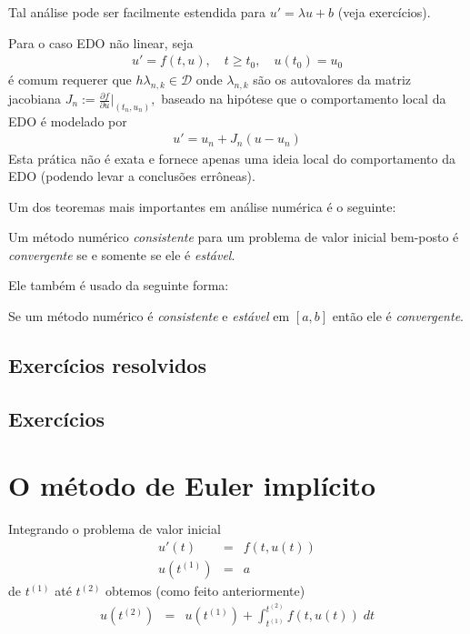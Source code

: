 Tal análise pode ser facilmente estendida para $u'=\lambda u+b$ (veja exercícios).

Para o caso EDO não linear, seja
\begin{eqnarray}
u'= f(t,u), \quad  t\geq t_0, \quad  u(t_0)=u_0
\end{eqnarray}
é comum requerer que $h\lambda _{n,k} \in \mathcal D$ onde $\lambda _{n,k}$ são os autovalores da matriz jacobiana $J_n := \frac{\partial f}{\partial u}|_{(t_n,u_n)},$ baseado na hipótese que o comportamento local da EDO é modelado por
\begin{eqnarray}
  u'= u_n + J_n(u-u_n)
\end{eqnarray}
Esta prática não é exata e fornece apenas uma ideia local do comportamento da EDO (podendo levar a conclusões errôneas).


Um dos teoremas mais importantes em análise numérica é o seguinte:

\begin{teo}
Um método numérico \emph{consistente} para um problema de valor inicial bem-posto é \emph{convergente} se e somente se ele é \emph{estável}.
\end{teo}


Ele também é usado da seguinte forma:

\begin{teo}
Se um método numérico é \emph{consistente} e \emph{estável} em $[a,b]$ então ele é \emph{convergente}.
\end{teo}



\subsection*{Exercícios resolvidos}

\emconstrucao

\subsection*{Exercícios}

\emconstrucao


\section{O método de Euler implícito}
Integrando o problema de valor inicial
\begin{eqnarray}
  u'(t)  &=& f(t,u(t)) \\
  u(t^{(1)}) &=& a
\end{eqnarray}
de $t^{(1)}$ até $t^{(2)}$ obtemos (como feito anteriormente)
\begin{eqnarray}
  u(t^{(2)})      &=& u(t^{(1)}) +  \int_{t^{(1)}}^{t^{(2)}} f(t,u(t)) \; dt
\end{eqnarray}

